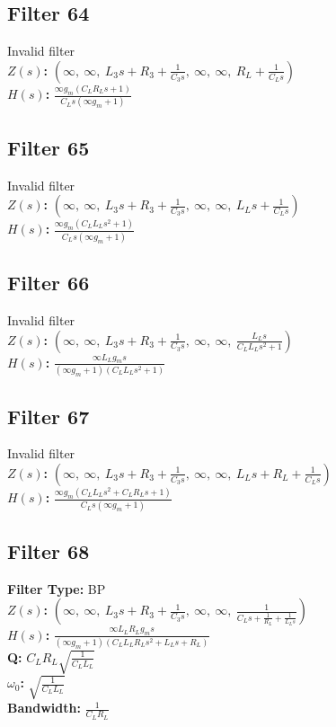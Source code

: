 \documentclass{article}
\begin{document}
\subsection*{Filter 64}
Invalid filter \\ 
\textbf{$Z(s)$:} $\left( \infty, \  \infty, \  L_{3} s + R_{3} + \frac{1}{C_{3} s}, \  \infty, \  \infty, \  R_{L} + \frac{1}{C_{L} s}\right)$ \\ 
\textbf{$H(s)$:} $\frac{\infty g_{m} \left(C_{L} R_{L} s + 1\right)}{C_{L} s \left(\infty g_{m} + 1\right)}$ \\ 
\subsection*{Filter 65}
Invalid filter \\ 
\textbf{$Z(s)$:} $\left( \infty, \  \infty, \  L_{3} s + R_{3} + \frac{1}{C_{3} s}, \  \infty, \  \infty, \  L_{L} s + \frac{1}{C_{L} s}\right)$ \\ 
\textbf{$H(s)$:} $\frac{\infty g_{m} \left(C_{L} L_{L} s^{2} + 1\right)}{C_{L} s \left(\infty g_{m} + 1\right)}$ \\ 
\subsection*{Filter 66}
Invalid filter \\ 
\textbf{$Z(s)$:} $\left( \infty, \  \infty, \  L_{3} s + R_{3} + \frac{1}{C_{3} s}, \  \infty, \  \infty, \  \frac{L_{L} s}{C_{L} L_{L} s^{2} + 1}\right)$ \\ 
\textbf{$H(s)$:} $\frac{\infty L_{L} g_{m} s}{\left(\infty g_{m} + 1\right) \left(C_{L} L_{L} s^{2} + 1\right)}$ \\ 
\subsection*{Filter 67}
Invalid filter \\ 
\textbf{$Z(s)$:} $\left( \infty, \  \infty, \  L_{3} s + R_{3} + \frac{1}{C_{3} s}, \  \infty, \  \infty, \  L_{L} s + R_{L} + \frac{1}{C_{L} s}\right)$ \\ 
\textbf{$H(s)$:} $\frac{\infty g_{m} \left(C_{L} L_{L} s^{2} + C_{L} R_{L} s + 1\right)}{C_{L} s \left(\infty g_{m} + 1\right)}$ \\ 
\subsection*{Filter 68}
\textbf{Filter Type:} BP \\ 
\textbf{$Z(s)$:} $\left( \infty, \  \infty, \  L_{3} s + R_{3} + \frac{1}{C_{3} s}, \  \infty, \  \infty, \  \frac{1}{C_{L} s + \frac{1}{R_{L}} + \frac{1}{L_{L} s}}\right)$ \\ 
\textbf{$H(s)$:} $\frac{\infty L_{L} R_{L} g_{m} s}{\left(\infty g_{m} + 1\right) \left(C_{L} L_{L} R_{L} s^{2} + L_{L} s + R_{L}\right)}$ \\ 
\textbf{Q:} $C_{L} R_{L} \sqrt{\frac{1}{C_{L} L_{L}}}$ \\ 
\textbf{$\omega_0$:} $\sqrt{\frac{1}{C_{L} L_{L}}}$ \\ 
\textbf{Bandwidth:} $\frac{1}{C_{L} R_{L}}$ \\ 
\end{document}

